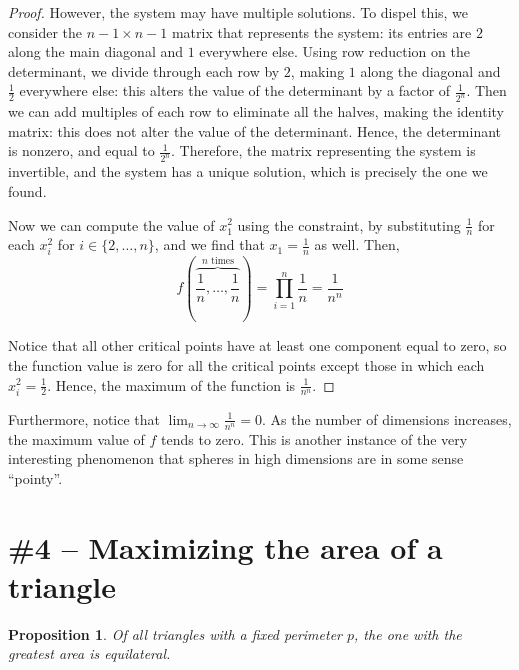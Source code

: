 \documentclass[letterpaper,11pt]{article}
\newtheorem{prop}{Proposition}
\newcommand{\parens}[1]{\left(#1\right)}
\begin{document}
\begin{proof}
  However, the system may have multiple solutions. To dispel this, we consider
  the $n-1 \times n-1$ matrix that represents the system: its entries are $2$
  along the main diagonal and $1$ everywhere else. Using row reduction on the
  determinant, we divide through each row by $2$, making $1$ along the diagonal
  and $\frac{1}{2}$ everywhere else: this alters the value of the determinant
  by a factor of $\frac{1}{2^n}$. Then we can add multiples of each row to
  eliminate all the halves, making the identity matrix: this does not alter the
  value of the determinant. Hence, the determinant is nonzero, and equal to
  $\frac{1}{2^n}$. Therefore, the matrix representing the system is invertible,
  and the system has a unique solution, which is precisely the one we found.

  Now we can compute the value of $x_1^2$ using the constraint, by substituting
  $\frac{1}{n}$ for each $x_i^2$ for $i \in \{2, \ldots, n\}$, and we find that
  $x_1 = \frac{1}{n}$ as well.
  Then,
  \begin{equation*}
    f\parens{\overbrace{\frac{1}{n}, \ldots, \frac{1}{n}}^\text{$n$ times}}
    = \prod_{i=1}^n \frac{1}{n} = \frac{1}{n^n}
  \end{equation*}

  Notice that all other critical points have at least one component equal to
  zero, so the function value is zero for all the critical points except those
  in which each $x_i^2 = \frac{1}{2}$. Hence, the maximum of the function is
  $\frac{1}{n^n}$.
\end{proof}

Furthermore, notice that $\lim_{n\to\infty} \frac{1}{n^n} = 0$. As the number
of dimensions increases, the maximum value of $f$ tends to zero. This is
another instance of the very interesting phenomenon that spheres in high
dimensions are in some sense ``pointy''.

\section*{\#4 -- Maximizing the area of a triangle}

\begin{prop}
  Of all triangles with a fixed perimeter $p$, the one with the greatest area
  is equilateral.
\end{prop}
\end{document}
